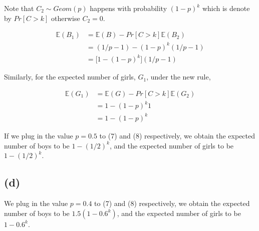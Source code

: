 \documentclass[10pt]{537homework}
\begin{document}
Note that $C_2 \sim Geom(p)$ happens with probability $(1-p)^k$ which is denote by $Pr[C>k]$ otherwise $C_2 = 0$. 

\begin{align}
  \mathbb{E}(B_1)   & = \mathbb{E}(B) - Pr[C>k]\mathbb{E}(B_2) \nonumber \\ 
                    & = (1/p - 1) - (1-p)^k (1/p-1) \nonumber \\
                    & = \big[ 1 - (1-p)^k \big](1/p - 1)
\end{align}

Similarly, for the expected number of girls, $G_1$, under the new rule,

\begin{align}
  \mathbb{E}(G_1)   & = \mathbb{E}(G) - Pr[C>k] \mathbb{E}(G_2) \nonumber \\ 
                    & = 1 - (1-p)^k 1 \nonumber \\
                    & = 1 - (1-p)^k
\end{align}

If we plug in the value $p=0.5$ to (7) and (8) respectively, we obtain the expected number of boys to be $1-(1/2)^k$, and the expected number of girls to be $1-(1/2)^k$.


\subsection*{(d)}

We plug in the value $p=0.4$ to (7) and (8) respectively, we obtain the expected number of boys to be $1.5(1-0.6^k)$, and the expected number of girls to be $1-0.6^k$.
\end{document}
